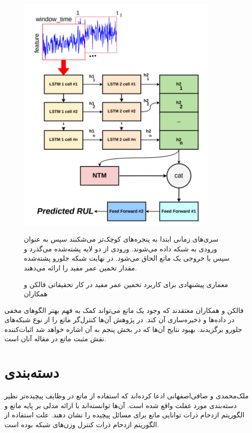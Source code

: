 \begin{figure}[!h]
\begin{center}
\includegraphics[height=12cm]{RUL.png}
\end{center}
\caption{معماری پیشنهادی برای کاربرد تخمین عمر مفید در کار تحقیقاتی فالکن و همکاران\cite{falcon2020neural}}
\medskip
\small
سری‌های زمانی ابتدا به پنجره‌های کوچک‌تر می‌شکنند سپس به عنوان ورودی به شبکه داده می‌شوند. ورودی از دو لایه  پشته‌شده می‌گذرد و سپس با خروجی یک ماتع الحاق می‌شود. در نهایت شبکه جلورو پشته‌شده مقدار تخمین عمر مفید را ارائه می‌دهند.\cite{falcon2020neural} 
\end{figure}

فالکن و همکاران معتقدند که وجود یک ماتع می‌تواند کمک به فهم بهتر الگوهای مخفی در داده‌ها و ذخیره‌سازی آن کند. در پژوهش آن‌ها کنترل‌گر ماتع را از نوع شبکه‌های جلورو برگزیدند.\cite{falcon2020neural} بهبود نتایج آن‌ها که در بخش پنجم به آن اشاره خواهد شد اثبات‌کننده نقش مثبت ماتع در مقاله آنان است.

\section{دسته‌بندی}
ملک‌محمدی و صافی‌اصفهانی ادعا کرده‌اند که استفاده از ماتع در وظایف پیچیده‌تر نظیر دسته‌بندی مورد غفلت واقع شده است. آن‌ها توانسته‌اند با ارائه مدلی بر پایه ماتع و الگوریتم ازدحام ذرات توانایی ماتع برای مسائل پیچیده را نشان دهند. علت استفاده از الگوریتم ازدحام ذرات کنترل وزن‌های شبکه بوده است.\cite{faradonbe2020classifier}
\\


